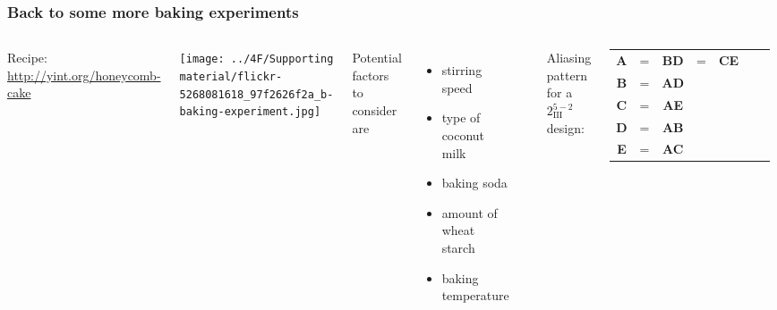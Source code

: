\begin{frame}\frametitle{Back to some more baking experiments}
	\begin{columns}[T]
		
			\vspace{1cm}
			{\small Recipe: \href{http://yint.org/honeycomb-cake}{http://yint.org/honeycomb-cake}}
		
			\vspace{1cm}
		
			\centerline{\texttt{[image: ../4F/Supporting material/flickr-5268081618\_97f2626f2a\_b-baking-experiment.jpg]}}
			
		
			Potential factors to consider are
			\begin{itemize}
				\item	stirring speed
				\item	type of coconut milk
				\item	baking soda
				\item	amount of wheat starch
				\item	baking temperature
			\end{itemize}
			
			\vspace{0.4cm}
			\hrule
			
			\vspace{0.1cm}
			Aliasing pattern for a $2^{5-2}_{\textrm{III}}$ design:
			\begin{tabulary}{\linewidth}{ccccccc}				
				\textbf{A} & = & \textbf{BD} & = & \textbf{CE}  \\
				\textbf{B} & = & \textbf{AD} & & \\
				\textbf{C} & = & \textbf{AE} & & \\
				\textbf{D} & = & \textbf{AB} & & \\
				\textbf{E} & = & \textbf{AC} & & 
			\end{tabulary}
			
	\end{columns}
	
	\vspace{1cm}

	
\end{frame}

